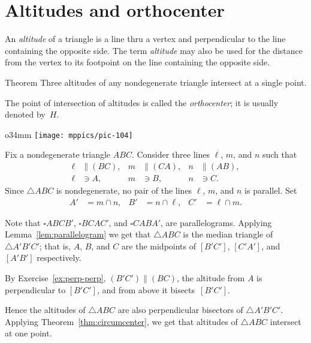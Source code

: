 \section{Altitudes and orthocenter}

An \emph{altitude} of a triangle is a line thru a vertex and perpendicular to the line containing the opposite side.
The term \emph{altitude} may also be used for the distance from the vertex to its footpoint on the line containing the opposite side.

\begin{thm}{Theorem}\label{thm:orthocenter}
Three altitudes of any nondegenerate triangle intersect at a single point.
\end{thm}

The point of intersection of altitudes is called the \emph{orthocenter}; 
it is usually denoted by~$H$.

{

\begin{wrapfigure}{o}{34mm}
\vskip-4mm
\centering
\texttt{[image: mppics/pic-104]}
\end{wrapfigure}

Fix a nondegenerate triangle $A B C$.
Consider three lines $\ell$, $m$, and $n$
such that 
\begin{align*}
\ell&\parallel(BC),
&
m&\parallel(CA),
&
n&\parallel(AB),
\\
\ell&\ni A,
&
m&\ni B,
&
n&\ni C.
\end{align*}
Since $\triangle A B C$ is nondegenerate,
no pair of the lines $\ell$, $m$, and $n$ is parallel.
Set 
\begin{align*}
A'&=m\cap n,
&
B'&=n\cap \ell,
&
C'&=\ell\cap m.
\end{align*}

}

Note that $\square A B C B'$, $\square B C A C'$, and $\square C A B A'$, are parallelograms.
Applying Lemma~\ref{lem:parallelogram} we get that $\triangle ABC$ is the median triangle of $\triangle A' B' C'$;
that is, $A$, $B$, and $C$ are the midpoints of $[B' C']$, $[C' A']$, and $[A' B']$ respectively.

By Exercise~\ref{ex:perp-perp},
$(B' C')\parallel (BC)$,
the altitude from $A$ is perpendicular to $[B' C']$, 
and from above it bisects~$[B' C']$.

Hence the altitudes of $\triangle A B C$ 
are also perpendicular bisectors of $\triangle A' B' C'$.
Applying Theorem~\ref{thm:circumcenter}, we get that altitudes of $\triangle ABC$ intersect at one point.
\qeds

